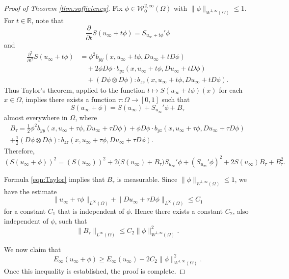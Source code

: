\documentclass[a4paper]{article}
\newcommand{\R}{\mathbb{R}}
\newcommand{\W}{\mathcal{W}}
\theoremstyle{remark}
\begin{document}
\begin{proof}[Proof of Theorem \ref{thm:sufficiency}]
Fix $\phi \in \W_0^{2, \infty}(\Omega)$ with $\|\phi\|_{W^{1, \infty}(\Omega)} \le 1$. For $t \in \R$, note that
\[
\frac{\partial}{\partial t} S(u_\infty + t\phi) = S_{u_\infty + t\phi}' \phi
\]
and
\[
\begin{split}
\frac{\partial^2}{\partial t^2} S(u_\infty + t\phi) & = \phi^2 b_{yy}(x, u_\infty + t\phi, Du_\infty + tD\phi) \\
& \quad + 2 \phi D\phi \cdot b_{yz}(x, u_\infty + t\phi, Du_\infty + tD\phi) \\
& \quad + (D\phi \otimes D\phi) : b_{zz}(x, u_\infty + t\phi, Du_\infty + tD\phi).
\end{split}
\]
Thus Taylor's theorem, applied to the function $t \mapsto S(u_\infty + t\phi)(x)$ for each $x \in \Omega$,
implies there exists a function $\tau \colon \Omega \to [0, 1]$ such that
\begin{equation} \label{eqn:Taylor}
S(u_\infty + \phi) = S(u_\infty) + S_{u_\infty}' \phi + B_\tau
\end{equation}
almost everywhere in $\Omega$, where
\begin{multline*}
B_\tau = \frac{1}{2} \phi^2 b_{yy}(x, u_\infty + \tau \phi, Du_\infty + \tau D\phi) + \phi D\phi \cdot b_{yz}(x, u_\infty + \tau \phi, Du_\infty + \tau D\phi) \\
+ \frac{1}{2} (D\phi \otimes D\phi) : b_{zz}(x, u_\infty + \tau \phi, Du_\infty + \tau D\phi).
\end{multline*}
Therefore,
\begin{equation} \label{eq:S-squared}
(S(u_\infty + \phi))^2 = (S(u_\infty))^2 + 2 \bigl(S(u_\infty) + B_\tau\bigr)S_{u_\infty}' \phi +  (S_{u_\infty}' \phi)^2 + 2S(u_\infty) B_\tau
+ B_\tau^2.
\end{equation}

Formula \eqref{eqn:Taylor} implies that $B_\tau$ is measurable. Since $\|\phi\|_{W^{1, \infty}(\Omega)} \le 1$,
we have the estimate
\[
\|u_\infty + \tau \phi\|_{L^\infty(\Omega)} + \|Du_\infty + \tau D\phi\|_{L^\infty(\Omega)} \le C_1
\]
for a constant $C_1$ that is independent of $\phi$. Hence there exists a constant $C_2$, also independent of $\phi$, such that
\begin{equation} \label{eq:B-estimate}
\|B_\tau\|_{L^\infty(\Omega)} \le C_2 \|\phi\|_{W^{1, \infty}(\Omega)}^2.
\end{equation}

We now claim that
\begin{equation} \label{eq:almost-mimimiser}
E_\infty(u_\infty + \phi) \ge E_\infty(u_\infty) - 2C_2 \|\phi\|_{W^{1, \infty}(\Omega)}^2.
\end{equation}
Once this inequality is established, the proof is complete.


\end{proof}
\end{document}
